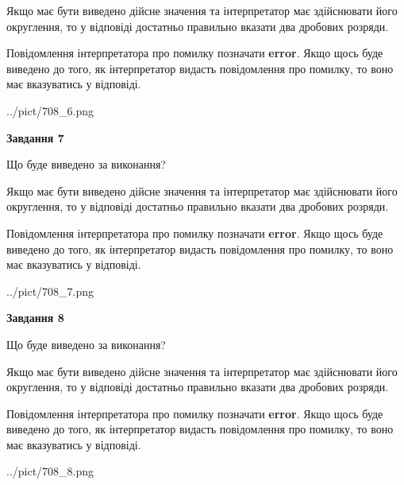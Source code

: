\documentclass[12pt, ukrainian]{article}
\begin{document}
{\begin {Large}
Якщо має бути виведено дійсне значення та інтерпретатор має здійснювати його округлення, 
то у відповіді достатньо правильно вказати два дробових розряди.

Повідомлення інтерпретатора про помилку позначати \textbf{error}.
Якщо щось буде виведено до того, як інтерпретатор видасть повідомлення про помилку, 
то воно має вказуватись у відповіді. \par

\begin{center}
	{../pict/708_6.png}
\end{center}
\newpage

{\begin {center}\textbf{Завдання 7}\end {center}}\par
Що буде виведено за виконання? \par

Якщо має бути виведено дійсне значення та інтерпретатор має здійснювати його округлення, 
то у відповіді достатньо правильно вказати два дробових розряди.

Повідомлення інтерпретатора про помилку позначати \textbf{error}.
Якщо щось буде виведено до того, як інтерпретатор видасть повідомлення про помилку, 
то воно має вказуватись у відповіді. \par

\begin{center}
	{../pict/708_7.png}
\end{center}
\newpage

{\begin {center}\textbf{Завдання 8}\end {center}}\par
Що буде виведено за виконання? \par

Якщо має бути виведено дійсне значення та інтерпретатор має здійснювати його округлення, 
то у відповіді достатньо правильно вказати два дробових розряди.

Повідомлення інтерпретатора про помилку позначати \textbf{error}.
Якщо щось буде виведено до того, як інтерпретатор видасть повідомлення про помилку, 
то воно має вказуватись у відповіді. \par

\begin{center}
	{../pict/708_8.png}
\end{center}
\newpage


\end{Large}}
\end{document}

